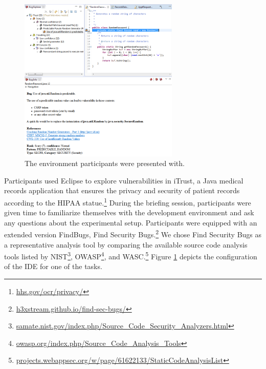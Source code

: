\documentclass[conference]{IEEEtran}
\begin{document}
\begin{figure}
\centering
\includegraphics[width=3in]{Images/environment.png}
\caption{The environment participants were presented with.}
\label{fig:environment} 
\end{figure}
	

Participants used Eclipse to explore vulnerabilities in iTrust, a Java medical records application that ensures the privacy and security of patient records according to the HIPAA statue.\footnote{\url{hhs.gov/ocr/privacy/}} 
During the briefing session, participants were given time to familiarize themselves with the development environment and ask any questions about the experimental setup.
Participants were equipped with an extended version FindBugs, Find Security Bugs.\footnote{\url{h3xstream.github.io/find-sec-bugs/}} 
We chose Find Security Bugs as a representative analysis tool by comparing the available source code analysis tools listed by NIST\footnote{\url{samate.nist.gov/index.php/Source_Code_Security_Analyzers.html}}, OWASP\footnote{\url{owasp.org/index.php/Source_Code_Analysis_Tools}}, and WASC.\footnote{\url{projects.webappsec.org/w/page/61622133/StaticCodeAnalysisList}}
Figure \ref{fig:environment} depicts the configuration of the IDE for one of the tasks.
\end{document}
